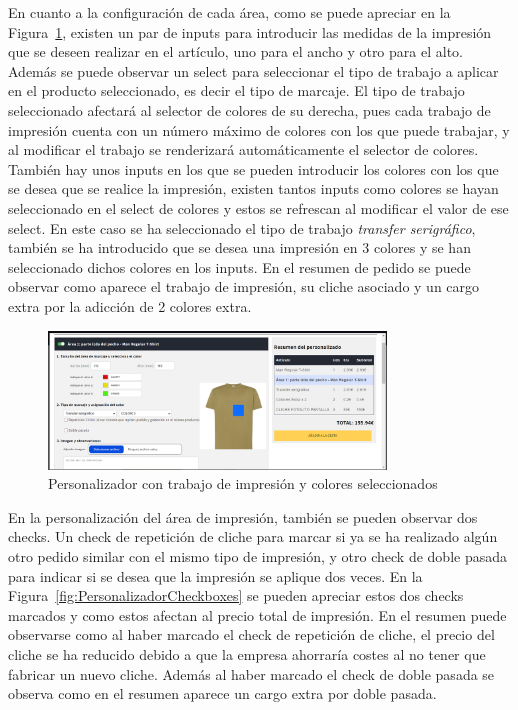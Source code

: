 \documentclass[11pt]{article}
\begin{document}
En cuanto a la configuración de cada área, como se puede apreciar en la Figura~\ref{fig:PersonalizadorColores}, existen un par de inputs para introducir las medidas de la impresión que se deseen 
realizar en el artículo, uno para el ancho y otro para el alto. Además se puede observar un select para seleccionar el tipo de trabajo a aplicar en el producto seleccionado, es decir el tipo de marcaje. El tipo de trabajo seleccionado
afectará al selector de colores de su derecha, pues cada trabajo de impresión cuenta con un número máximo de colores con los que puede trabajar, y al modificar el trabajo se renderizará automáticamente el selector de colores.
También hay unos inputs en los que se pueden introducir los colores con los que se desea que se realice la impresión, existen tantos inputs como colores se hayan seleccionado en el select de colores y estos
se refrescan al modificar el valor de ese select. En este caso se ha seleccionado el tipo de trabajo \textit{transfer serigráfico}, también se ha introducido que se desea una impresión en 3 colores y se han seleccionado dichos colores en los inputs.
En el resumen de pedido se puede observar como aparece el trabajo de impresión, su cliche asociado y un cargo extra por la adicción de 2 colores extra.

\begin{figure}[H]
    \centering
    \includegraphics[width=0.8\textwidth]{imagenes/ManualUsuario/PersonalizadorArea1ColoresSeleccionados.png}
    \caption{\label{fig:PersonalizadorColores}Personalizador con trabajo de impresión y colores seleccionados}
    \vspace{\fill}
\end{figure}

En la personalización del área de impresión, también se pueden observar dos checks. Un check de repetición de cliche para marcar si ya se ha realizado algún otro pedido similar con el mismo tipo de impresión,
y otro check de doble pasada para indicar si se desea que la impresión se aplique dos veces. En la Figura~\ref{fig:PersonalizadorCheckboxes} se pueden apreciar estos dos checks marcados y como estos
afectan al precio total de impresión. En el resumen puede observarse como al haber marcado el check de repetición de cliche, el precio del cliche se ha reducido debido a que la empresa ahorraría costes al no tener que 
fabricar un nuevo cliche. Además al haber marcado el check de doble pasada se observa como en el resumen aparece un cargo extra por doble pasada.
\end{document}
